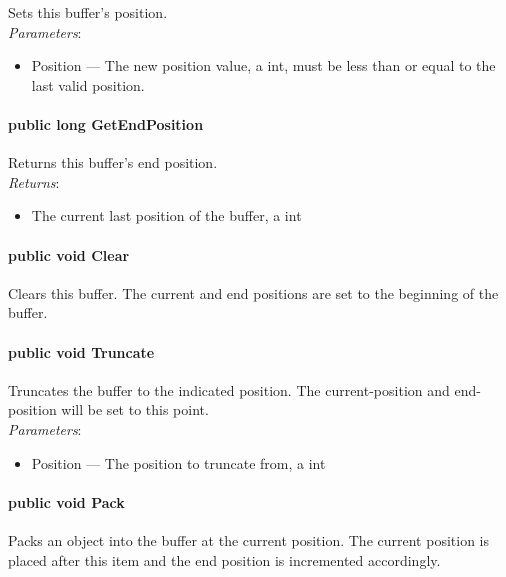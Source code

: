 \documentclass[$Date: 2003/06/26 19:29:31 $]{glabarticle}
\begin{document}
Sets this buffer's position. \\

\textit{Parameters}:
\begin{itemize}
\item[] Position --- The new position value, a int, must be less than or equal to the last valid position.
\end{itemize}

\paragraph{public long GetEndPosition}

Returns this buffer's end position. \\

\textit{Returns}:
\begin{itemize}
\item[] The current last position of the buffer, a int
\end{itemize}

\paragraph{public void Clear}

Clears this buffer. The current and end positions are set to the
beginning of the buffer. \\
 
\paragraph{public void Truncate}

Truncates the buffer to the indicated position.  The current-position
and end-position will be set to this point. \\

\textit{Parameters}:
\begin{itemize}
\item[] Position --- The position to truncate from, a int
\end{itemize}

\paragraph{public void Pack}

Packs an object into the buffer at the current position.
The current position is placed after this item and the end
position is incremented accordingly. \\
\end{document}
